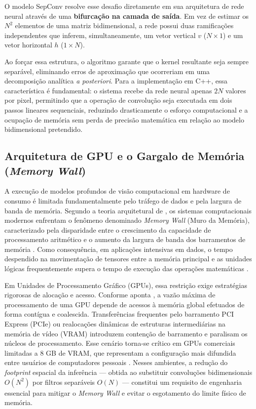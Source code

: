 \documentclass[
    12pt,                %
    openright,           %
    oneside,             %
    a4paper,             %
    english,             %
    brazil               %
]{abntex2}
\begin{document}
O modelo SepConv resolve esse desafio diretamente em sua arquitetura de rede neural através de uma \textbf{bifurcação na camada de saída}. Em vez de estimar os $N^2$ elementos de uma matriz bidimensional, a rede possui duas ramificações independentes que inferem, simultaneamente, um vetor vertical $v$ ($N \times 1$) e um vetor horizontal $h$ ($1 \times N$). 

Ao forçar essa estrutura, o algoritmo garante que o kernel resultante seja sempre separável, eliminando erros de aproximação que ocorreriam em uma decomposição analítica \textit{a posteriori}. Para a implementação em C++, essa característica é fundamental: o sistema recebe da rede neural apenas $2N$ valores por pixel, permitindo que a operação de convolução seja executada em dois passos lineares sequenciais, reduzindo drasticamente o esforço computacional e a ocupação de memória sem perda de precisão matemática em relação ao modelo bidimensional pretendido.

\subsection{Arquitetura de GPU e o Gargalo de Memória (\textit{Memory Wall})}
\label{sec:memory_wall}

A execução de modelos profundos de visão computacional em hardware de consumo é limitada fundamentalmente pelo tráfego de dados e pela largura de banda de memória. Segundo a teoria arquitetural de , os sistemas computacionais modernos enfrentam o fenômeno denominado \textit{Memory Wall} (Muro da Memória), caracterizado pela disparidade entre o crescimento da capacidade de processamento aritmético e o aumento da largura de banda dos barramentos de memória \cite{Hennessy2022}. Como consequência, em aplicações intensivas em dados, o tempo despendido na movimentação de tensores entre a memória principal e as unidades lógicas frequentemente supera o tempo de execução das operações matemáticas \cite{Hennessy2022}.

Em Unidades de Processamento Gráfico (GPUs), essa restrição exige estratégias rigorosas de alocação e acesso. Conforme aponta , a vazão máxima de processamento de uma GPU depende de acessos à memória global efetuados de forma contígua e coalescida. Transferências frequentes pelo barramento PCI Express (PCIe) ou realocações dinâmicas de estruturas intermediárias na memória de vídeo (VRAM) introduzem contenção de barramento e paralisam os núcleos de processamento. Esse cenário torna-se crítico em GPUs comerciais limitadas a 8 GB de VRAM, que representam a configuração mais difundida entre usuários de computadores pessoais \cite{SteamSurvey2026}. Nesses ambientes, a redução do \textit{footprint} espacial da inferência --- obtida ao substituir convoluções bidimensionais $O(N^2)$ por filtros separáveis $O(N)$ --- constitui um requisito de engenharia essencial para mitigar o \textit{Memory Wall} e evitar o esgotamento do limite físico de memória.
\end{document}
